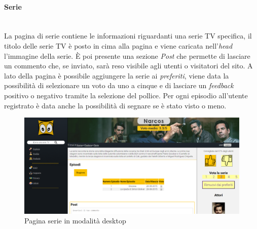\paragraph{Serie}
~\\
La pagina di serie contiene le informazioni riguardanti una serie TV specifica, il titolo delle serie TV è posto in cima alla pagina e viene caricata nell'\textit{head} l'immagine della serie. È poi presente una sezione \textit{Post} che permette di lasciare un commento che, se inviato, sarà reso visibile agli utenti o visitatori del sito. A lato della pagina è possibile aggiungere la serie ai \textit{preferiti}, viene data la possibilità di selezionare un voto da uno a cinque e di lasciare un \textit{feedback} positivo o negativo tramite la selezione del pollice. Per ogni episodio all'utente registrato è data anche la possibilità  di segnare se è stato visto o meno. 

\begin{figure}[H]
	\centerline{\includegraphics[scale= 0.15]{img/serie.png}}
	\caption{Pagina serie in modalità desktop}
	
\end{figure}

